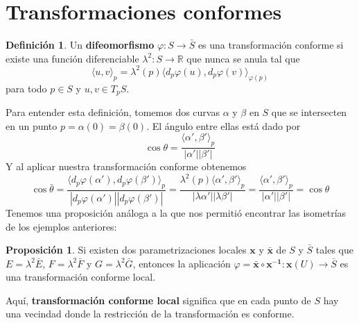 \documentclass[spanish]{book}
\theoremstyle{definition}
\newtheorem*{defn}{Definición}
\newtheorem*{prop}{Proposición}
\begin{document}
\section{Transformaciones conformes}
\begin{defn}
	Un \textbf{difeomorfismo} $\varphi:S\to\bar S$ es una transformación conforme si existe una función diferenciable $\lambda^2:S\to\mathbb{R}$ que nunca se anula tal que
	\[\langle u,v\rangle_p=\lambda^2(p)\langle d_p\varphi(u),d_p\varphi(v)\rangle_{\varphi(p)}\]
	para todo $p\in S$ y $u,v\in T_pS$.
	
	Para entender esta definición, tomemos dos curvas $\alpha$ y $\beta$ en $S$ que se intersecten en un punto $p=\alpha(0)=\beta(0)$. El ángulo entre ellas está dado por
	\[\cos\theta=\frac{\langle\alpha',\beta'\rangle_p}{|\alpha'||\beta'|}\]
	Y al aplicar nuestra transformación conforme obtenemos
	\[\cos\bar\theta=\frac{\langle d_p\varphi(\alpha'),d_p\varphi(\beta')\rangle_p}{|d_p\varphi(\alpha')||d_p\varphi(\beta')|}=\frac{\lambda^2(p)\langle\alpha',\beta'\rangle_p}{|\lambda\alpha'||\lambda\beta'|}=\frac{\langle\alpha',\beta'\rangle_p}{|\alpha'||\beta'|}=\cos\theta\]
	Tenemos una proposición análoga a la que nos permitió encontrar las isometrías de los ejemplos anteriores:
\end{defn}
\begin{prop}
	Si existen dos parametrizaciones locales $\mathbf{x}$ y $\bar{\mathbf{x}}$ de $S$ y $\bar{S}$ tales que $E=\lambda^2\bar{E}$, $F=\lambda^2\bar{F}$ y $G=\lambda^2\bar{G}$, entonces la aplicación $\varphi=\mathbf{\bar{x}\circ\mathbf{x}^{-1}}:\mathbf{x}(U)\to\bar{S}$ es una transformación conforme local.
\end{prop}
	Aquí, \textbf{transformación conforme local} significa que en cada punto de $S$ hay una vecindad donde la restricción de la transformación es conforme.
\end{document}
